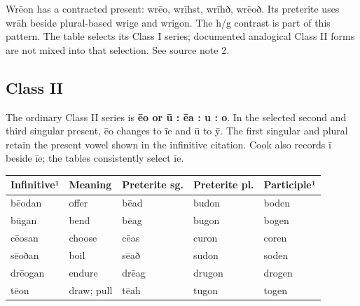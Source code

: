 Wrēon has a contracted present: wrēo, wrīhst, wrīhð, wrēoð. Its preterite uses wrāh beside plural-based wrige and wrigon. The h/\allowbreak{}g contrast is part of this pattern. The table selects its Class I series; documented analogical Class II forms are not mixed into that selection. See source note 2.

\subsection*{Class II}

The ordinary Class II series is \textbf{ēo or ū : ēa : u : o}. In the selected second and third singular present, ēo changes to īe and ū to ȳ. The first singular and plural retain the present vowel shown in the infinitive citation. Cook also records ī beside īe; the tables consistently select īe.

\par\begingroup
\fontsize{10.5}{13.2}\selectfont
\setlength{\LTleft}{0pt}\setlength{\LTright}{\fill}
\noindent
\begin{tabular}{@{}>{\raggedright\arraybackslash}p{23.14mm}>{\raggedright\arraybackslash}p{21.04mm}>{\raggedright\arraybackslash}p{22.72mm}>{\raggedright\arraybackslash}p{22.72mm}>{\raggedright\arraybackslash}p{23.14mm}@{}}
\toprule
\textbf{Infinitive¹} & \textbf{Meaning} & \textbf{Preterite sg.} & \textbf{Preterite pl.} & \textbf{Participle¹} \\
\midrule
bēodan & offer & bēad & budon & boden \\
būgan & bend & bēag & bugon & bogen \\
cēosan & choose & cēas & curon & coren \\
sēoðan & boil & sēað & sudon & soden \\
drēogan & endure & drēag & drugon & drogen \\
tēon & draw; pull & tēah & tugon & togen \\
\bottomrule
\end{tabular}
\par\endgroup

